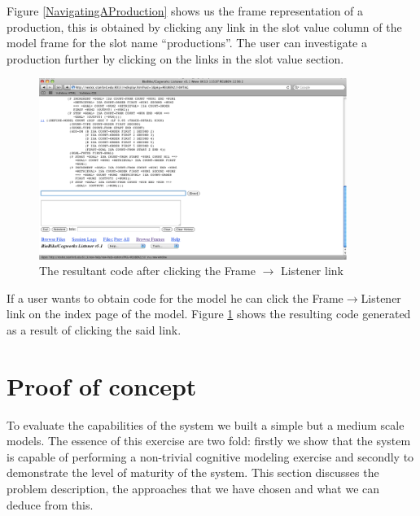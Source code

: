 Figure \ref{NavigatingAProduction} shows us the frame representation
of a production, this is obtained by clicking any link in the slot
value column of the model frame for the slot name ``productions''. The
user can investigate a production further by clicking on the links in
the slot value section. 

\begin{figure}[htp]
  \centering
  \includegraphics[width=100mm]{ConvertFrameToImage}
  \caption{The resultant code after clicking the Frame $\rightarrow$ Listener
    link}
  \label{ConvertFrameToImage}
\end{figure}

If a user wants to obtain code for the model he can click the
Frame$\rightarrow$Listener link on the index page of the model. Figure
\ref{ConvertFrameToImage} shows the resulting code generated as a
result of clicking the said link.


\section{Proof of concept}





To evaluate the capabilities of the system we built a simple but a
medium scale models. The essence of this exercise are two fold:
firstly we show that the system is capable of performing a non-trivial
cognitive modeling exercise and secondly to demonstrate the level of
maturity of the system. This section discusses the problem description,
the approaches that we have chosen and what we can deduce from this.

